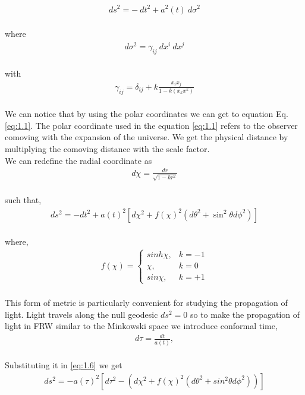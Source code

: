 \begin{align}
    d{s^2} = -\ d{t^2} + a^2(t) \ d{\sigma^2}\label{eq:1.2}
\end{align}\\
where 
\begin{align}
     d{\sigma^2} = \gamma_{ij} \ d{x^{i}} \ d{x^{j}}\label{eq:1.3}
\end{align}\\
with 
\begin{align}
    \gamma_{ij}= \delta_{ij} + k\frac{x_{i}x_{j}}{1-k(x_k x^k)}\label{eq:1.4}
\end{align}\\
\hspace{0.5cm}We can notice that by using the polar coordinates we can get to equation Eq. \eqref{eq:1.1}. The polar coordinate used in the equation \eqref{eq:1.1} refers to the observer comoving with the expansion of the universe. We get the physical distance by multiplying the comoving distance with the scale factor.\\
We can redefine the radial coordinate as  
\begin{align}
    d\chi = \frac{dr}{\sqrt{1-k r^2}}\label{eq:1.5}
\end{align}\\
such that,
\begin{align}
   ds^2= -dt^2 + a(t)^2\left[{d\chi^2}+ f(\chi)^2(d\theta^2 +\sin^2\theta d\phi^2)\right ]\label{eq:1.6}
\end{align}\\
where,
\begin{align}
    f(\chi) = \begin{cases}
        sinh\chi,& k=-1\\
        \chi,& k=0\\
        sin\chi,& k=+1
    \end{cases}
\end{align}\\
This form of metric is particularly convenient for studying the propagation of light. Light travels along the null geodesic $ds^2=0$ so to make the propagation of light in FRW similar to the Minkowski space we introduce conformal time,
\begin{align}
    d\tau = \frac{dt}{a(t)},\label{eq:1.8}
\end{align}\\
Substituting it in \eqref{eq:1.6} we get 
\begin{align}
    ds^2= -a(\tau)^2\left[d\tau^2 - \left({d\chi^2}+ f(\chi)^2(d\theta^2 +sin^2\theta d\phi^2)\right)\right ]\label{eq:1.9}
\end{align}

